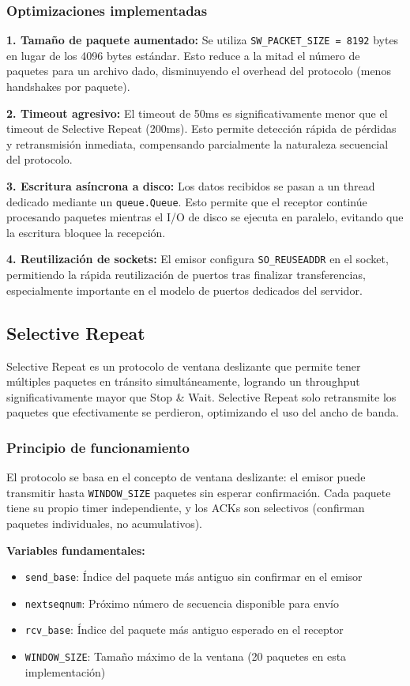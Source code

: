 \subsubsection{Optimizaciones implementadas}

\textbf{1. Tamaño de paquete aumentado:}
Se utiliza \texttt{SW\_PACKET\_SIZE = 8192} bytes en lugar de los 4096 bytes estándar. Esto reduce a la mitad el número de paquetes para un archivo dado, disminuyendo el overhead del protocolo (menos handshakes por paquete).

\textbf{2. Timeout agresivo:}
El timeout de 50ms es significativamente menor que el timeout de Selective Repeat (200ms). Esto permite detección rápida de pérdidas y retransmisión inmediata, compensando parcialmente la naturaleza secuencial del protocolo.

\textbf{3. Escritura asíncrona a disco:}
Los datos recibidos se pasan a un thread dedicado mediante un \texttt{queue.Queue}. Esto permite que el receptor continúe procesando paquetes mientras el I/O de disco se ejecuta en paralelo, evitando que la escritura bloquee la recepción.

\textbf{4. Reutilización de sockets:}
El emisor configura \texttt{SO\_REUSEADDR} en el socket, permitiendo la rápida reutilización de puertos tras finalizar transferencias, especialmente importante en el modelo de puertos dedicados del servidor.


\subsection{Selective Repeat}

Selective Repeat es un protocolo de ventana deslizante que permite tener múltiples paquetes en tránsito simultáneamente, logrando un throughput significativamente mayor que Stop \& Wait. Selective Repeat solo retransmite los paquetes que efectivamente se perdieron, optimizando el uso del ancho de banda.

\subsubsection{Principio de funcionamiento}

El protocolo se basa en el concepto de ventana deslizante: el emisor puede transmitir hasta \texttt{WINDOW\_SIZE} paquetes sin esperar confirmación. Cada paquete tiene su propio timer independiente, y los ACKs son selectivos (confirman paquetes individuales, no acumulativos).

\textbf{Variables fundamentales:}
\begin{itemize}
    \item \texttt{send\_base}: Índice del paquete más antiguo sin confirmar en el emisor
    \item \texttt{nextseqnum}: Próximo número de secuencia disponible para envío
    \item \texttt{rcv\_base}: Índice del paquete más antiguo esperado en el receptor
    \item \texttt{WINDOW\_SIZE}: Tamaño máximo de la ventana (20 paquetes en esta implementación)
\end{itemize}

